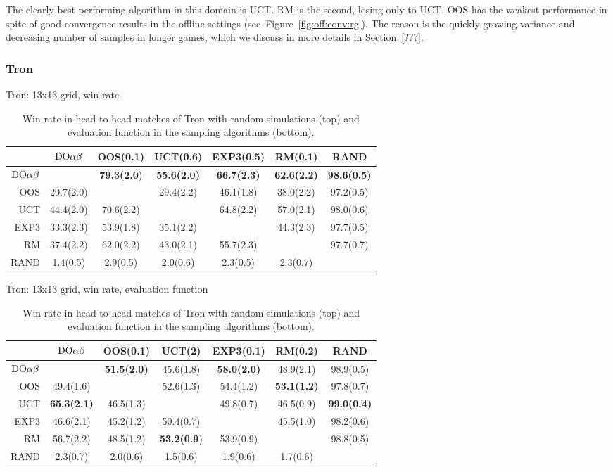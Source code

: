 The clearly best performing algorithm in this domain is UCT.
RM is the second, losing only to UCT.
OOS has the weakest performance in spite of good convergence results in the offline settings (see~Figure~\ref{fig:off:conv:rg}). The reason is the quickly growing variance and decreasing number of samples in longer games, which we discuss in more details in Section~\ref{???}. 

\subsubsection{Tron}

\begin{table}[t!]
\centering
\begin{scriptsize}
Tron: 13x13 grid, win rate
\begin{tabular}{|r|cccccc|}\hline
&$\textrm{DO}\alpha\beta$&OOS(0.1)&UCT(0.6)&EXP3(0.5)&RM(0.1)&RAND\\\hline
$\textrm{DO}\alpha\beta$&&\textbf{79.3(2.0})&\textbf{55.6(2.0)}&\textbf{66.7(2.3)}&\textbf{62.6(2.2)}&\textbf{98.6(0.5)}\\
OOS&20.7(2.0)&&29.4(2.2)&46.1(1.8)&38.0(2.2)&97.2(0.5)\\
UCT&44.4(2.0)&70.6(2.2)&&64.8(2.2)&57.0(2.1)&98.0(0.6)\\
EXP3&33.3(2.3)&53.9(1.8)&35.1(2.2)&&44.3(2.3)&97.7(0.5)\\
RM&37.4(2.2)&62.0(2.2)&43.0(2.1)&55.7(2.3)&&97.7(0.7)\\
RAND&1.4(0.5)&2.9(0.5)&2.0(0.6)&2.3(0.5)&2.3(0.7)&\\
\hline
\end{tabular}

Tron: 13x13 grid, win rate, evaluation function
\begin{tabular}{|r|cccccc|}\hline
&$\textrm{DO}\alpha\beta$&OOS(0.1)&UCT(2)&EXP3(0.1)&RM(0.2)&RAND\\\hline
$\textrm{DO}\alpha\beta$&&\textbf{51.5(2.0)}&45.6(1.8)&\textbf{58.0(2.0)}&48.9(2.1)&98.9(0.5)\\
OOS&49.4(1.6)&&52.6(1.3)&54.4(1.2)&\textbf{53.1(1.2)}&97.8(0.7)\\
UCT&\textbf{65.3(2.1)}&46.5(1.3)&&49.8(0.7)&46.5(0.9)&\textbf{99.0(0.4)}\\
EXP3&46.6(2.1)&45.2(1.2)&50.4(0.7)&&45.5(1.0)&98.2(0.6)\\
RM&56.7(2.2)&48.5(1.2)&\textbf{53.2(0.9})&53.9(0.9)&&98.8(0.5)\\
RAND&2.3(0.7)&2.0(0.6)&1.5(0.6)&1.9(0.6)&1.7(0.6)&\\
\hline
\end{tabular}
\end{scriptsize}
\caption{Win-rate in head-to-head matches of Tron with random simulations (top) and evaluation function in the sampling algorithms (bottom).}\label{fig:matches:tron}
\end{table}

